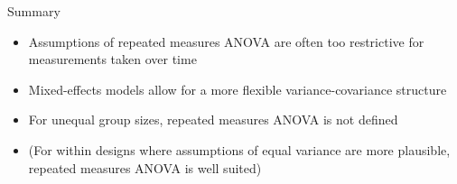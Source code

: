 \documentclass[aspectratio=169]{beamer}
\newcommand{\vect}[1]{\mathbf{#1}}
\begin{document}
 
% 
% 
% 
% 
% 
% 
% 
% 

\begin{frame}[<+->]{Summary}
  \begin{itemize}
    \item Assumptions of repeated measures ANOVA are often too restrictive
      for measurements taken over time
    \item Mixed-effects models allow for a more flexible variance-covariance
      structure
    \item For unequal group sizes, repeated measures ANOVA is not defined
    \item (For within designs where assumptions of equal variance are more
      plausible, repeated measures ANOVA is well suited)
  \end{itemize}
  \vfill
\end{frame}
\end{document}
